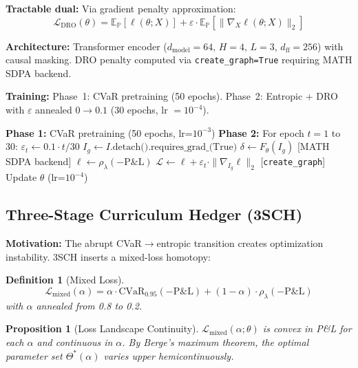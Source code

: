 \documentclass[11pt]{article}
\newtheorem{proposition}[theorem]{Proposition}
\newtheorem{definition}[theorem]{Definition}
\newcommand{\E}{\mathbb{E}}
\newcommand{\PP}{\mathbb{P}}
\newcommand{\cvar}{\mathrm{CVaR}}
\begin{document}
\textbf{Tractable dual:} Via gradient penalty approximation:
\begin{equation}
    \mathcal{L}_{\mathrm{DRO}}(\theta) = \E_\PP[\ell(\theta; X)] + \varepsilon \cdot \E_\PP[\|\nabla_X \ell(\theta; X)\|_2]
    \label{eq:dro}
\end{equation}

\textbf{Architecture:} Transformer encoder ($d_{\mathrm{model}} = 64$, $H = 4$, $L = 3$, $d_{\mathrm{ff}} = 256$) with causal masking. DRO penalty computed via \texttt{create\_graph=True} requiring MATH SDPA backend.

\textbf{Training:} Phase~1: CVaR pretraining (50 epochs). Phase~2: Entropic + DRO with $\varepsilon$ annealed $0 \to 0.1$ (30 epochs, lr $= 10^{-4}$).

\begin{algorithm}[t]
\caption{W-DRO-T Training}
\label{alg:wdrot}
\begin{algorithmic}[1]
\STATE \textbf{Phase 1:} CVaR pretraining (50 epochs, lr=$10^{-3}$)
\STATE \textbf{Phase 2:} For epoch $t = 1$ to 30:
\STATE \quad $\varepsilon_t \gets 0.1 \cdot t/30$
\STATE \quad $I_g \gets I.\text{detach().requires\_grad\_(True)}$
\STATE \quad $\delta \gets F_\theta(I_g)$ [MATH SDPA backend]
\STATE \quad $\ell \gets \rho_\lambda(-\mathrm{P\&L})$
\STATE \quad $\mathcal{L} \gets \ell + \varepsilon_t \cdot \|\nabla_{I_g} \ell\|_2$ [\texttt{create\_graph}]
\STATE \quad Update $\theta$ (lr=$10^{-4}$)
\end{algorithmic}
\end{algorithm}

\subsection{Three-Stage Curriculum Hedger (3SCH)}

\textbf{Motivation:} The abrupt CVaR$\to$entropic transition creates optimization instability. 3SCH inserts a mixed-loss homotopy:

\begin{definition}[Mixed Loss]
\begin{equation}
    \mathcal{L}_{\mathrm{mixed}}(\alpha) = \alpha \cdot \cvar_{0.95}(-\mathrm{P\&L}) + (1-\alpha) \cdot \rho_\lambda(-\mathrm{P\&L})
    \label{eq:mixed}
\end{equation}
with $\alpha$ annealed from 0.8 to 0.2.
\end{definition}

\begin{proposition}[Loss Landscape Continuity]
$\mathcal{L}_{\mathrm{mixed}}(\alpha; \theta)$ is convex in P\&L for each $\alpha$ and continuous in $\alpha$. By Berge's maximum theorem, the optimal parameter set $\Theta^*(\alpha)$ varies upper hemicontinuously.
\end{proposition}
\end{document}
